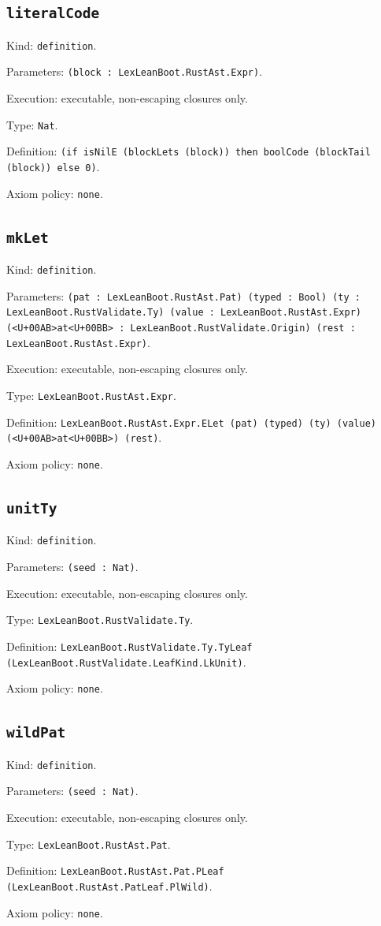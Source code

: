\documentclass[11pt]{article}
\begin{document}
\subsection*{\texttt{literalCode}}
\noindent Kind: \texttt{definition}.\par
\noindent Parameters: \texttt{(block : LexLeanBoot.RustAst.Expr)}.\par
\noindent Execution: executable, non-escaping closures only.\par
\noindent Type: \texttt{Nat}.\par
\noindent Definition: \texttt{(if isNilE (blockLets (block)) then boolCode (blockTail (block)) else 0)}.\par
\noindent Axiom policy: \texttt{none}.\par
\subsection*{\texttt{mkLet}}
\noindent Kind: \texttt{definition}.\par
\noindent Parameters: \texttt{(pat : LexLeanBoot.RustAst.Pat) (typed : Bool) (ty : LexLeanBoot.RustValidate.Ty) (value : LexLeanBoot.RustAst.Expr) (<U+00AB>at<U+00BB> : LexLeanBoot.RustValidate.Origin) (rest : LexLeanBoot.RustAst.Expr)}.\par
\noindent Execution: executable, non-escaping closures only.\par
\noindent Type: \texttt{LexLeanBoot.RustAst.Expr}.\par
\noindent Definition: \texttt{LexLeanBoot.RustAst.Expr.ELet (pat) (typed) (ty) (value) (<U+00AB>at<U+00BB>) (rest)}.\par
\noindent Axiom policy: \texttt{none}.\par
\subsection*{\texttt{unitTy}}
\noindent Kind: \texttt{definition}.\par
\noindent Parameters: \texttt{(seed : Nat)}.\par
\noindent Execution: executable, non-escaping closures only.\par
\noindent Type: \texttt{LexLeanBoot.RustValidate.Ty}.\par
\noindent Definition: \texttt{LexLeanBoot.RustValidate.Ty.TyLeaf (LexLeanBoot.RustValidate.LeafKind.LkUnit)}.\par
\noindent Axiom policy: \texttt{none}.\par
\subsection*{\texttt{wildPat}}
\noindent Kind: \texttt{definition}.\par
\noindent Parameters: \texttt{(seed : Nat)}.\par
\noindent Execution: executable, non-escaping closures only.\par
\noindent Type: \texttt{LexLeanBoot.RustAst.Pat}.\par
\noindent Definition: \texttt{LexLeanBoot.RustAst.Pat.PLeaf (LexLeanBoot.RustAst.PatLeaf.PlWild)}.\par
\noindent Axiom policy: \texttt{none}.\par
\end{document}
